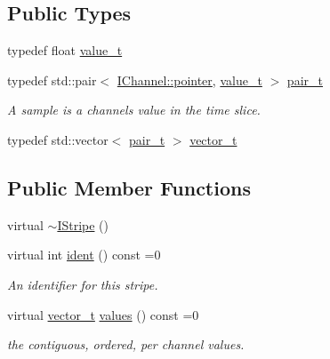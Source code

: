 \subsection*{Public Types}
\begin{DoxyCompactItemize}
\item 
typedef float \hyperlink{class_wire_cell_1_1_i_stripe_af0dd73bc2517c2c848c24ea56caefde6}{value\+\_\+t}
\item 
typedef std\+::pair$<$ \hyperlink{class_wire_cell_1_1_i_data_aff870b3ae8333cf9265941eef62498bc}{I\+Channel\+::pointer}, \hyperlink{class_wire_cell_1_1_i_stripe_af0dd73bc2517c2c848c24ea56caefde6}{value\+\_\+t} $>$ \hyperlink{class_wire_cell_1_1_i_stripe_a7d2b2bbfd3cd13724a7b7475f1850acd}{pair\+\_\+t}
\begin{DoxyCompactList}\small\item\em A sample is a channel\textquotesingle{}s value in the time slice. \end{DoxyCompactList}\item 
typedef std\+::vector$<$ \hyperlink{class_wire_cell_1_1_i_stripe_a7d2b2bbfd3cd13724a7b7475f1850acd}{pair\+\_\+t} $>$ \hyperlink{class_wire_cell_1_1_i_stripe_af5a7b9f663e9ecbc71edfb44c989101e}{vector\+\_\+t}
\end{DoxyCompactItemize}
\subsection*{Public Member Functions}
\begin{DoxyCompactItemize}
\item 
virtual \hyperlink{class_wire_cell_1_1_i_stripe_a9b78345e262c75719dfdd50fd71c246d}{$\sim$\+I\+Stripe} ()
\item 
virtual int \hyperlink{class_wire_cell_1_1_i_stripe_a9873be5b4e6796ac5f08ea1511b0ae1f}{ident} () const =0
\begin{DoxyCompactList}\small\item\em An identifier for this stripe. \end{DoxyCompactList}\item 
virtual \hyperlink{class_wire_cell_1_1_i_stripe_af5a7b9f663e9ecbc71edfb44c989101e}{vector\+\_\+t} \hyperlink{class_wire_cell_1_1_i_stripe_aff1919f580099c2465c7d83dc9d7de18}{values} () const =0
\begin{DoxyCompactList}\small\item\em the contiguous, ordered, per channel values. \end{DoxyCompactList}\end{DoxyCompactItemize}


